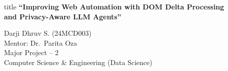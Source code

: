 {
\begin{frame}[plain]
  \vfill
  \begin{beamercolorbox}[sep=16pt,center]{title}
    {\Large\bfseries\color{white} ``Improving Web Automation with DOM Delta Processing\\[4pt]
    and Privacy-Aware LLM Agents''}
  \end{beamercolorbox}
  \vskip0.5cm
  \begin{center}
    {\large Darji Dhruv S. (24MCD003)}\\[6pt]
    {\normalsize Mentor: Dr.\ Parita Oza}\\[12pt]
    {\normalsize Major Project -- 2}\\[6pt]
    {\small Computer Science \& Engineering (Data Science)}
  \end{center}
  \vfill
\end{frame}
}
